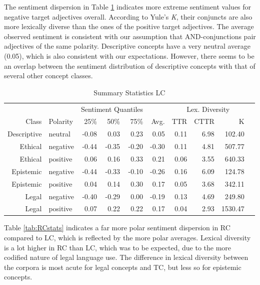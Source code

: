 \documentclass{article}
\begin{document}
The sentiment dispersion in Table \ref{tab:LCstats} indicates more extreme sentiment values for negative target adjectives overall. According to Yule's \textit{K}, their conjuncts are also more lexically diverse than the ones of the positive target adjectives. The average observed sentiment is consistent with our assumption that AND-conjunctions pair adjectives of the same polarity. Descriptive concepts have a very neutral average (0.05), which is also consistent with our expectations. However, there seems to be an overlap between the sentiment distribution of descriptive concepts with that of several other concept classes.

\begin{table}[!h]
\centering
{}
\begin{tabular}{rlrrrrrrrr}
  & & \multicolumn{3}{c}{Sentiment Quantiles} & & \multicolumn{3}{c}{Lex. Diversity}\\
   \cmidrule{3-5} \cmidrule{7-9}
  Class & Polarity & 25\% & 50\% & 75\% & Avg. &  TTR & CTTR & K\\
  \bottomrule
Descriptive & neutral & -0.08 & 0.03 & 0.23 & 0.05 & 0.11 & 6.98 & 102.40 \\ 
   Ethical & negative & -0.44 & -0.35 & -0.20 & -0.30 & 0.11 & 4.81 & 507.77 \\ 
  Ethical & positive & 0.06 & 0.16 & 0.33 & 0.21 & 0.06 & 3.55 & 640.33 \\ 
  Epistemic & negative & -0.44 & -0.33 & -0.10 & -0.26 & 0.16 & 6.09 & 124.78 \\ 
  Epistemic & positive & 0.04 & 0.14 & 0.30 & 0.17 & 0.05 & 3.68 & 342.11 \\ 
  Legal & negative & -0.40 & -0.29 & 0.00 & -0.19 & 0.13 & 4.69 & 249.80 \\ 
  Legal & positive & 0.07 & 0.22 & 0.22 & 0.17 & 0.04 & 2.93 & 1530.47 \\ 
   \hline
\end{tabular}
\caption{Summary Statistics LC}
\label{tab:LCstats}
\end{table}

Table \ref{tab:RCstats} indicates a far more polar sentiment dispersion in RC compared to LC, which is reflected by the more polar averages. Lexical diversity is a lot higher in RC than LC, which was to be expected, due to the more codified nature of legal language use. The difference in lexical diversity between the corpora is most acute for legal concepts and TC, but less so for epistemic concepts.
\end{document}

